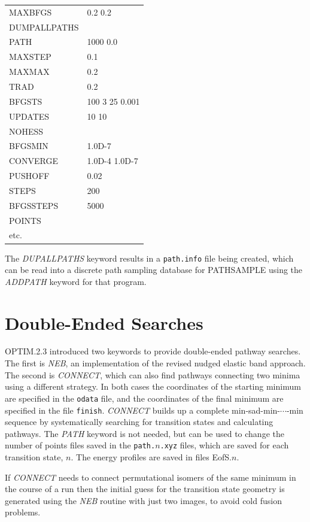 \documentclass[12pt,a4paper,dvips]{article}
\begin{document}
\medskip
\begin{tabular}{ll}
MAXBFGS  & 0.2 0.2 \\
DUMPALLPATHS \\
PATH   & 1000 0.0 \\
MAXSTEP & 0.1 \\
MAXMAX  & 0.2 \\
TRAD & 0.2 \\
BFGSTS  & 100 3 25 0.001 \\
UPDATES & 10 10 \\
NOHESS \\
BFGSMIN  & 1.0D-7 \\
CONVERGE & 1.0D-4 1.0D-7 \\
PUSHOFF & 0.02 \\
STEPS    & 200 \\
BFGSSTEPS & 5000 \\
POINTS \\
etc. \\
\end{tabular}

\noindent The {\it DUPALLPATHS\/} keyword results in a {\tt path.info} file being created, which
can be read into a discrete path sampling database for PATHSAMPLE using the
{\it ADDPATH} keyword for that program.

\section{Double-Ended Searches}
\label{sec:double}
OPTIM.2.3 introduced two keywords to provide double-ended pathway searches.
The first is {\it NEB\/}, 
an implementation of the revised nudged elastic band approach.\cite{HenkelmanJ00,HenkelmanUJ00}
The second is {\it CONNECT\/}, which can also find pathways connecting two minima using a different
strategy. In both cases the coordinates of the starting minimum are specified in the {\tt odata} file,
and the coordinates of the final minimum are specified in the file {\tt finish}.
{\it CONNECT\/} builds up a complete min-sad-min-$\cdots$-min sequence by systematically 
searching for transition
states and calculating pathways. The {\it PATH\/} keyword is not needed, but can be used to change the
number of points files saved in the {\tt path.$n$.xyz} files, which are saved for each transition state, $n$.
The energy profiles are saved in files EofS.$n$.

If {\it CONNECT\/} needs to connect permutational isomers of the same minimum in the
course of a run then the initial guess for the transition state geometry is generated
using the {\it NEB\/} routine with just two images, to avoid cold fusion problems.
\end{document}
